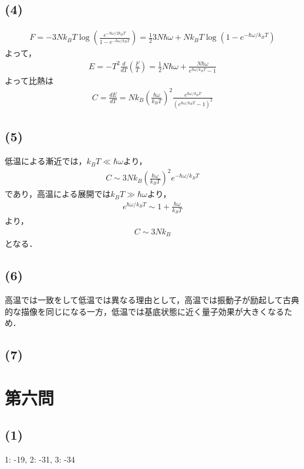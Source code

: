\documentclass[12pt,dvipdfmx]{jsarticle}
\begin{document}
\subsection*{(4)}
\begin{eqnarray}
  F = -3N k_BT \log \left( \frac{e^{-\hbar\omega/2k_BT}}{1-e^{-\hbar\omega/k_BT}} \right) = \frac{1}{2}3N\hbar\omega + Nk_BT \log \left( 1-e^{-\hbar\omega/k_BT} \right)
\end{eqnarray}
よって，
\begin{eqnarray}
  E = -T^2 \frac{d}{dT}\left( \frac{F}{T} \right) = \frac{1}{2}N\hbar\omega + \frac{N\hbar\omega}{e^{\hbar\omega/k_B T}-1}
\end{eqnarray}
よって比熱は
\begin{eqnarray}
  C = \frac{dE}{dT} = Nk_B\left( \frac{\hbar\omega}{k_BT} \right)^2 \frac{e^{\hbar\omega/k_BT}}{(e^{\hbar\omega/k_BT}-1)^2}
\end{eqnarray}
\subsection*{(5)}
低温による漸近では，$k_B T \ll \hbar\omega$より，
\begin{eqnarray}
  C \sim 3Nk_B\left( \frac{\hbar\omega}{k_BT} \right)^2 e^{-\hbar\omega/k_BT}
\end{eqnarray}
であり，高温による展開では$k_B T \gg \hbar\omega$より，
\begin{eqnarray}
  e^{\hbar\omega/k_BT} \sim 1 + \frac{\hbar\omega}{k_BT}
\end{eqnarray}
より，
\begin{eqnarray}
  C \sim 3N k_B
\end{eqnarray}
となる．
\subsection*{(6)}
高温では一致をして低温では異なる理由として，高温では振動子が励起して古典的な描像を同じになる一方，低温では基底状態に近く量子効果が大きくなるため．
\subsection*{(7)}
\section*{\Large{第六問}}
\subsection*{(1)}
1: -19, 2: -31, 3: -34
\end{document}
